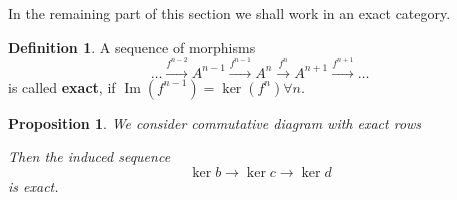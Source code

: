 \documentclass[5pt]{article}
\newtheorem{proposition}[theorem]{Proposition}
\theoremstyle{definition}
\newtheorem{definition}[theorem]{Definition}
\theoremstyle{remark}
\renewcommand{\bar}[1]{\overline{#1}}
\DeclareMathOperator{\Img}{Im}
\begin{document}
	In the remaining part of this section we shall work in an exact category.
	\begin{definition}
		A sequence of morphisms
		\begin{equation}
			\dots \xrightarrow{f^{n-2}} A^{n-1} \xrightarrow{f^{n-1}} A^n \xrightarrow{f^{n}}A^{n+1} \xrightarrow{f^{n+1}} \dots
		\end{equation}
		is called \textbf{exact}, if $\Img(f^{n-1})=\ker(f^n) \forall n$. \\
	\end{definition}
	\begin{proposition}
		We consider commutative diagram with exact rows
		\begin{center}
		\end{center}
		Then the induced sequence 
		\begin{equation}
			\ker b \rightarrow \ker c \rightarrow \ker d
		\end{equation}
		is exact.
	\end{proposition}
	
\end{document}
